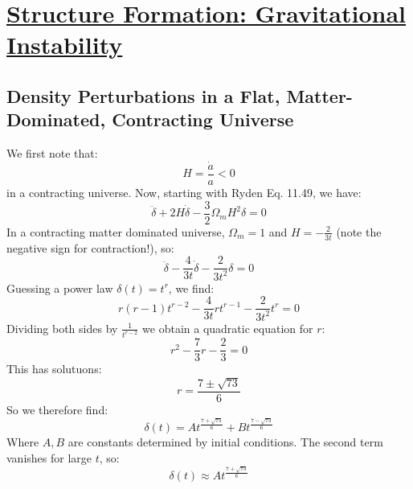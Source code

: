 \section[Structure Formation: Gravitational Instability]{\hyperlink{toc}{Structure Formation: Gravitational Instability}}

\subsection{Density Perturbations in a Flat, Matter-Dominated, Contracting Universe}
We first note that:
\begin{equation}
    H = \frac{\dot{a}}{a} < 0
\end{equation}
in a contracting universe. Now, starting with Ryden Eq. 11.49, we have:
\begin{equation}
    \ddot{\delta} + 2H\dot{\delta} - \frac{3}{2}\Omega_m H^2\delta = 0
\end{equation}
In a contracting matter dominated universe, $\Omega_m = 1$ and $H = -\frac{2}{3t}$ (note the negative sign for contraction!), so:
\begin{equation}
    \ddot{\delta} - \frac{4}{3t}\dot{\delta} - \frac{2}{3t^2}\delta = 0
\end{equation}
Guessing a power law $\delta(t) = t^r$, we find:
\begin{equation}
    r(r-1)t^{r-2} - \frac{4}{3t}rt^{r-1} - \frac{2}{3t^2}t^r = 0
\end{equation}
Dividing both sides by $\frac{1}{t^{r-2}}$ we obtain a quadratic equation for $r$:
\begin{equation}
    r^2 - \frac{7}{3}r - \frac{2}{3} = 0
\end{equation}
This has solutuons:
\begin{equation}
    r = \frac{7 \pm \sqrt{73}}{6}
\end{equation}
So we therefore find:
\begin{equation}
    \boxed{\delta(t) = At^{\frac{7 + \sqrt{73}}{6}} + Bt^{\frac{7 - \sqrt{73}}{6}}}
\end{equation}
Where $A, B$ are constants determined by initial conditions. The second term vanishes for large $t$, so:
\begin{equation}
    \boxed{\delta(t) \approx At^{\frac{7 + \sqrt{73}}{6}}}
\end{equation}
\subsection{}
\subsection{}
\subsection{}
\subsection{}
\subsection{}